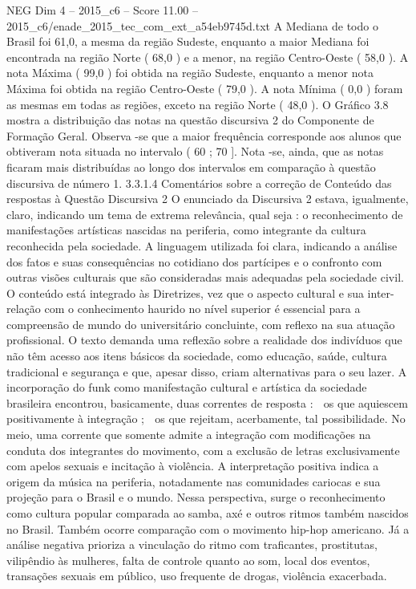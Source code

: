 \begin{textsample}{NEG Dim 4 – 2015\_c6 – Score 11.00 – 2015\_c6/enade\_2015\_tec\_com\_ext\_a54eb9745d.txt}
A Mediana de todo o Brasil foi 61,0, a mesma da região Sudeste, enquanto a maior Mediana foi encontrada na região Norte ( 68,0 ) e a menor, na região Centro-Oeste ( 58,0 ).
A nota Máxima ( 99,0 ) foi obtida na região Sudeste, enquanto a menor nota Máxima foi obtida na região Centro-Oeste ( 79,0 ).
A nota Mínima ( 0,0 ) foram as mesmas em todas as regiões, exceto na região Norte ( 48,0 ).
O Gráfico 3.8 mostra a distribuição das notas na questão discursiva 2 do Componente de Formação Geral.
Observa -se que a maior frequência corresponde aos alunos que obtiveram nota situada no intervalo ( 60 ; 70 ].
Nota -se, ainda, que as notas ficaram mais distribuídas ao longo dos intervalos em comparação à questão discursiva de número 1. 3.3.1.4 Comentários sobre a correção de Conteúdo das respostas à Questão Discursiva 2 O enunciado da Discursiva 2 estava, igualmente, claro, indicando um tema de extrema relevância, qual seja : o reconhecimento de manifestações artísticas nascidas na periferia, como integrante da cultura reconhecida pela sociedade.
A linguagem utilizada foi clara, indicando a análise dos fatos e suas consequências no cotidiano dos partícipes e o confronto com outras visões culturais que são consideradas mais adequadas pela sociedade civil.
O conteúdo está integrado às Diretrizes, vez que o aspecto cultural e sua inter-relação com o conhecimento haurido no nível superior é essencial para a compreensão de mundo do universitário concluinte, com reflexo na sua atuação profissional.
O texto demanda uma reflexão sobre a realidade dos indivíduos que não têm acesso aos itens básicos da sociedade, como educação, saúde, cultura tradicional e segurança e que, apesar disso, criam alternativas para o seu lazer.
A incorporação do funk como manifestação cultural e artística da sociedade brasileira encontrou, basicamente, duas correntes de resposta :  os que aquiescem positivamente à integração ;  os que rejeitam, acerbamente, tal possibilidade.
No meio, uma corrente que somente admite a integração com modificações na conduta dos integrantes do movimento, com a exclusão de letras exclusivamente com apelos sexuais e incitação à violência.
A interpretação positiva indica a origem da música na periferia, notadamente nas comunidades cariocas e sua projeção para o Brasil e o mundo.
Nessa perspectiva, surge o reconhecimento como cultura popular comparada ao samba, axé e outros ritmos também nascidos no Brasil.
Também ocorre comparação com o movimento hip-hop americano.
Já a análise negativa prioriza a vinculação do ritmo com traficantes, prostitutas, vilipêndio às mulheres, falta de controle quanto ao som, local dos eventos, transações sexuais em público, uso frequente de drogas, violência exacerbada.

\end{textsample}
